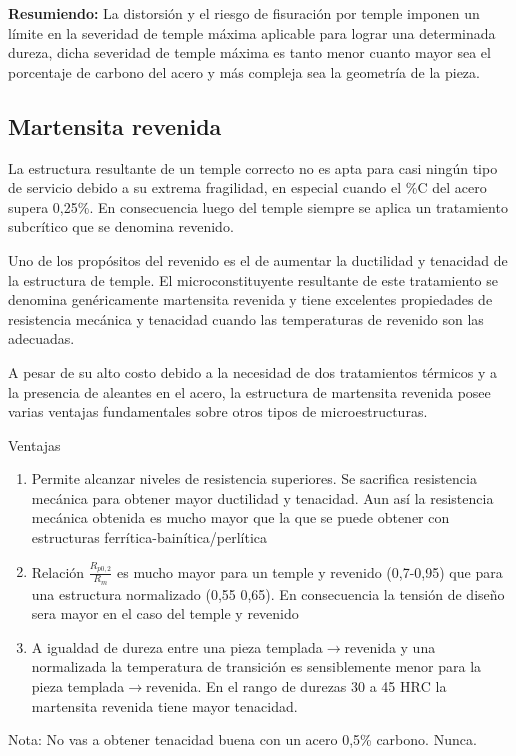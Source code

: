 \documentclass{article}
\newcommand{\HRC}{\ensuremath{\mathrm{HRC}}}
\newcommand{\goright}{\ensuremath{\rightarrow}}
\begin{document}
\textbf{Resumiendo:} La distorsión y el riesgo de fisuración por temple imponen un límite en la severidad de temple máxima aplicable para lograr una determinada dureza, dicha severidad de temple máxima es tanto menor cuanto mayor sea el porcentaje de carbono del acero y más compleja sea la geometría de
la pieza.

\subsection{Martensita revenida}
La estructura resultante de un temple correcto no es apta para casi ningún tipo de servicio debido a su extrema fragilidad, en especial cuando el \%C del acero supera 0,25\%. En consecuencia luego del temple siempre se aplica un tratamiento subcrítico que se denomina revenido.

Uno de los propósitos del revenido es el de aumentar la ductilidad y tenacidad de la estructura de temple. El microconstituyente resultante de este tratamiento se denomina genéricamente martensita revenida y tiene excelentes propiedades de resistencia mecánica y tenacidad cuando las temperaturas de revenido son las adecuadas.

A pesar de su alto costo debido a la necesidad de dos tratamientos térmicos y a la presencia de aleantes en el acero, la estructura de martensita revenida posee varias ventajas fundamentales sobre otros tipos de microestructuras.


Ventajas
\begin{enumerate}
    \item Permite alcanzar niveles de resistencia superiores. Se sacrifica resistencia mecánica para obtener mayor ductilidad y tenacidad. Aun así la resistencia mecánica obtenida es mucho mayor que la que se puede obtener con estructuras ferrítica-bainítica/perlítica
    \item Relación $\frac{R_{p0,2}}{R_m}$ es mucho mayor para un temple y revenido (0,7-0,95) que para una estructura normalizado (0,55 0,65). En consecuencia la tensión de diseño sera mayor en el caso del temple y revenido
    \item A igualdad de dureza entre una pieza templada\goright{}revenida y una normalizada la temperatura de transición es sensiblemente menor para la pieza templada\goright{}revenida. En el rango de durezas 30 a 45 $\HRC$ la martensita revenida tiene mayor tenacidad.
\end{enumerate}
Nota: No vas a obtener tenacidad buena con un acero 0,5\% carbono. Nunca.
\end{document}
